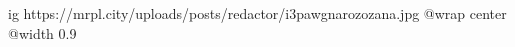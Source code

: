  
 
 
 
 

\ifcmt
  ig https://mrpl.city/uploads/posts/redactor/i3pawgnarozozana.jpg
  @wrap center
  @width 0.9
\fi
